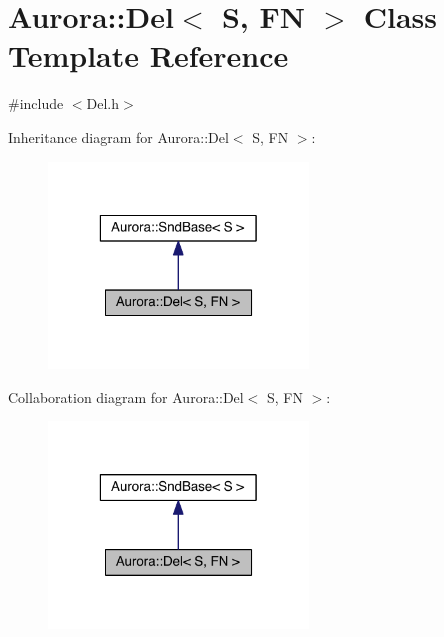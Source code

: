 \hypertarget{class_aurora_1_1_del}{}\section{Aurora\+:\+:Del$<$ S, FN $>$ Class Template Reference}
\label{class_aurora_1_1_del}


{\ttfamily \#include $<$Del.\+h$>$}



Inheritance diagram for Aurora\+:\+:Del$<$ S, FN $>$\+:
\nopagebreak
\begin{figure}[H]
\begin{center}
\leavevmode
\includegraphics[width=196pt]{class_aurora_1_1_del__inherit__graph}
\end{center}
\end{figure}


Collaboration diagram for Aurora\+:\+:Del$<$ S, FN $>$\+:
\nopagebreak
\begin{figure}[H]
\begin{center}
\leavevmode
\includegraphics[width=196pt]{class_aurora_1_1_del__coll__graph}
\end{center}
\end{figure}
